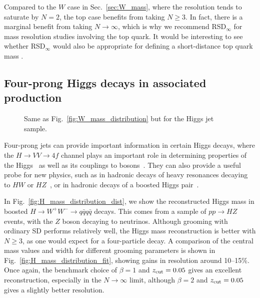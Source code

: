 \documentclass[11pt,a4paper]{article}
\DeclareRobustCommand{\Sec}[1]{Sec.~\ref{#1}}
\DeclareRobustCommand{\Fig}[1]{Fig.~\ref{#1}}
\begin{document}
Compared to the $W$ case in \Sec{sec:W_mass}, where the resolution tends to saturate by $N = 2$, the top case benefits from taking $N \geq 3$.
%
In fact, there is a marginal benefit from taking $N \to \infty$, which is why we recommend RSD$_\infty$ for mass resolution studies involving the top quark.
%
It would be interesting to see whether RSD$_{\infty}$ would also be appropriate for defining a short-distance top quark mass \cite{Hoang:2017kmk}.


\subsection{Four-prong Higgs decays in associated production}\label{sec:higgs_mass}


\begin{figure}[t]
\centering
{}
\qquad
{}
\caption{Same as \Fig{fig:W_mass_distribution} but for the Higgs jet sample.}
\label{fig:H_mass_bestfit_distribution}
\end{figure}

Four-prong jets can provide important information in certain Higgs
decays, where the $H\rightarrow VV\rightarrow 4f$ channel plays an
important role in determining properties of the
Higgs~\cite{Choi:2002jk} as well as its couplings to
bosons~\cite{Meyer:2004ha}.
%
They can also provide a useful probe for new physics, such as in
hadronic decays of heavy resonances decaying to $HW$ or
$HZ$~\cite{Khachatryan:2015bma}, or in hadronic decays of a boosted
Higgs pair~\cite{Bishara:2016kjn}.

In \Fig{fig:H_mass_distribution_dist}, we show the reconstructed Higgs mass in boosted $H\rightarrow W^+W^-\rightarrow q\bar{q}q\bar{q}$ decays.
%
This comes from a sample of $pp \rightarrow HZ$ events, with the $Z$
boson decaying to neutrinos.
%
Although grooming with ordinary SD performs relatively well,
the Higgs mass reconstruction is better with $N\geq 3$,
as one would expect for a four-particle decay.
%
A comparison of the central mass values and width for different
grooming parameters is shown in \Fig{fig:H_mass_distribution_fit},
showing gains in resolution around 10--15\%.
%
Once again, the benchmark choice of $\beta=1$ and $z_{\rm{cut}} =0.05$
gives an excellent reconstruction, especially in the $N \to \infty$
limit, although $\beta=2$ and $z_{\rm{cut}} =0.05$ gives a slightly
better resolution.
\end{document}
